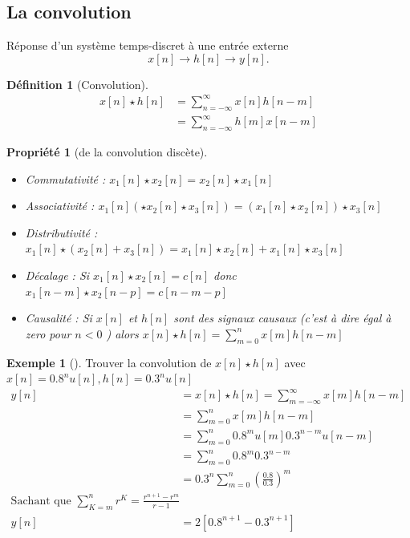 \documentclass{article}
\theoremstyle{plain}%
\newtheorem{prop}[thm]{Propriété}
\theoremstyle{definition}
\newtheorem{defn}{Définition}[section]
\newtheorem{exmp}{Exemple}[section]
\theoremstyle{remark}
\begin{document}
\subsection{La convolution}
Réponse d'un système temps-discret à une entrée externe
\[
    x[n] \to h[n] \to y[n]
.\]
\begin{defn}[Convolution]
    \begin{align*}
        x[n] \star h[n] &= \sum_{n=-\infty }^{\infty }x[n]h[n-m] \\
            &= \sum_{n=-\infty }^{\infty }h[m] x[n-m]
    \end{align*}
\end{defn}
\begin{prop}[de la convolution discète]
    $ \text{} $ 
    \begin{itemize}
        \item Commutativité : $ x_1[n] \star x_2[n] = x_2[n] \star x_1[n]$ 
        \item Associativité : $ x_1[n] (\star x_2[n] \star x_3[n]) = (x_1[n] \star x_2[n]) \star x_3[n]$ 
        \item Distributivité : $ x_1[n] \star (x_2[n] + x_3[n]) = x_1[n] \star x_2[n] + x_1[n] \star x_3[n]$ 
        \item Décalage : Si $ x_1[n] \star x_2[n] = c[n]$  donc $ x_1[n-m] \star x_2[n-p] = c[n-m-p] $ 
        \item Causalité : Si $ x[n] $ et $ h[n] $ sont des signaux causaux (c'est à dire égal à zero pour $ n<0 $ ) alors $ x[n] \star h[n] = \sum_{m=0}^{n}x[m] h[n-m] $ 
    \end{itemize}
\end{prop}

\begin{exmp}[]
    Trouver la convolution de $ x[n] \star h[n] $ avec $ x[n] = 0.8^n u[n], h[n] = 0.3^n u[n] $ \begin{align*}
        y[n] &= x[n] \star h[n] = \sum_{m=-\infty }^{\infty}x[m]h[n-m] \\
            &= \sum_{m=0}^{n} x[m] h[n-m] \\
            &= \sum_{m=0}^{n} 0.8^m u[m] 0.3^{n-m} u[n-m] \\
            &= \sum_{m=0}^{n} 0.8^m 0.3^{n-m} \\
            &= 0.3^n \sum_{m=0}^{n} (\frac{0.8}{0.3})^m  \\
            \text{Sachant que } \sum_{K=m}^{n} r^K = \frac{r^{n+1} - r^m}{r - 1} \\ 
        y[n] &= 2[0.8^{n+1} - 0.3^{n+1}]
    \end{align*}
\end{exmp}
\end{document}
